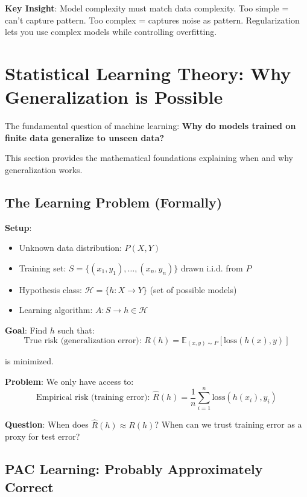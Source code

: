 \begin{insightbox}
\textbf{Key Insight}: Model complexity must match data complexity. Too simple = can't capture pattern. Too complex = captures noise as pattern. Regularization lets you use complex models while controlling overfitting.
\end{insightbox}

\section{Statistical Learning Theory: Why Generalization is Possible}

The fundamental question of machine learning: \textbf{Why do models trained on finite data generalize to unseen data?}

This section provides the mathematical foundations explaining when and why generalization works.

\subsection{The Learning Problem (Formally)}

\textbf{Setup}:
\begin{itemize}
    \item Unknown data distribution: $P(X, Y)$
    \item Training set: $S = \{(x_1, y_1), \ldots, (x_n, y_n)\}$ drawn i.i.d. from $P$
    \item Hypothesis class: $\mathcal{H} = \{h: X \to Y\}$ (set of possible models)
    \item Learning algorithm: $A: S \to h \in \mathcal{H}$
\end{itemize}

\textbf{Goal}: Find $h$ such that:
\begin{equation}
\text{True risk (generalization error): } R(h) = \mathbb{E}_{(x,y)\sim P}[\text{loss}(h(x), y)]
\end{equation}

is minimized.

\textbf{Problem}: We only have access to:
\begin{equation}
\text{Empirical risk (training error): } \hat{R}(h) = \frac{1}{n} \sum_{i=1}^{n} \text{loss}(h(x_i), y_i)
\end{equation}

\textbf{Question}: When does $\hat{R}(h) \approx R(h)$? When can we trust training error as a proxy for test error?

\subsection{PAC Learning: Probably Approximately Correct}

